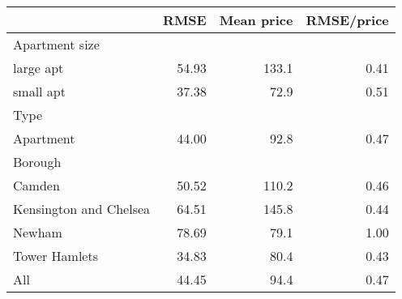 
\begin{tabular}{lrrr}
\toprule
 & RMSE & Mean price & RMSE/price\\
\midrule
Apartment size &  &  & \\
large apt & 54.93 & 133.1 & 0.41\\
small apt & 37.38 & 72.9 & 0.51\\
Type &  &  & \\
Apartment & 44.00 & 92.8 & 0.47\\
Borough &  &  & \\
Camden & 50.52 & 110.2 & 0.46\\
Kensington and Chelsea & 64.51 & 145.8 & 0.44\\
Newham & 78.69 & 79.1 & 1.00\\
Tower Hamlets & 34.83 & 80.4 & 0.43\\
All & 44.45 & 94.4 & 0.47\\
\bottomrule
\end{tabular}